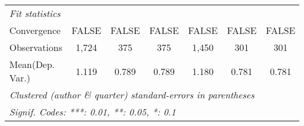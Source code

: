 \begin{tabular}{lcccccc}
   \midrule
   \emph{Fit statistics}\\
   Convergence             &FALSE    & FALSE  & FALSE         & FALSE   & FALSE  & FALSE\\  
   Observations            & 1,724   & 375    & 375           & 1,450   & 301    & 301\\  
Mean(Dep. Var.) & 1.119 & 0.789 & 0.789 & 1.180 & 0.781 & 0.781 \\
   \midrule \midrule
   \multicolumn{7}{l}{\emph{Clustered (author \& quarter) standard-errors in parentheses}}\\
   \multicolumn{7}{l}{\emph{Signif. Codes: ***: 0.01, **: 0.05, *: 0.1}}\\
\end{tabular}
\par\endgroup
